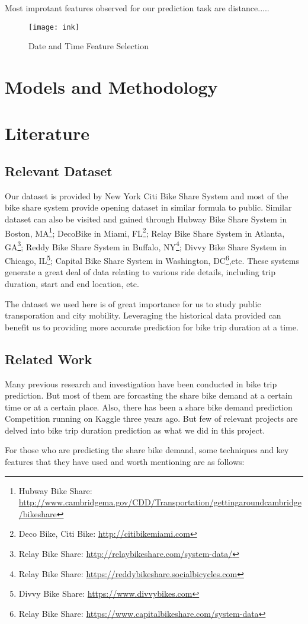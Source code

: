 Most improtant features observed for our prediction task are distance.....

  \begin{figure}[h!]
  \centering
  \texttt{[image: ink]}
  \caption{Date and Time Feature Selection}
  \label{fig_date}
  \end{figure}



\section{Models and Methodology}

\section{Literature}
\subsection{Relevant Dataset}
\par Our dataset is provided by New York Citi Bike Share System and most of the bike share system provide opening dataset in similar formula to public. Similar dataset can also be visited and gained through Hubway Bike Share System in Boston, MA\footnote{Hubway Bike Share:
\url{http://www.cambridgema.gov/CDD/Transportation/gettingaroundcambridge/bikeshare}}; DecoBike in Miami, FL\footnote{Deco Bike, Citi Bike:
\url{http://citibikemiami.com}}; Relay Bike Share System in Atlanta, GA\footnote{Relay Bike Share:
\url{http://relaybikeshare.com/system-data/}}; Reddy Bike Share System in Buffalo, NY\footnote{Relay Bike Share:
\url{https://reddybikeshare.socialbicycles.com}}; Divvy Bike Share System in Chicago, IL\footnote{Divvy Bike Share:
\url{https://www.divvybikes.com}}; Capital Bike Share System in Washington, DC\footnote{Relay Bike Share:
\url{https://www.capitalbikeshare.com/system-data}},etc. These systems generate a great deal of data relating to various ride details, including trip duration, start and end location, etc.
\par The dataset we used here is of great importance for us to study public transporation and city mobility. Leveraging the historical data provided can benefit us to providing more accurate prediction for bike trip duration at a time.
\subsection{Related Work}
\par Many previous research and investigation have been conducted in bike trip prediction. But most of them are forcasting the share bike demand at a certain time or at a certain place. Also, there has been a share bike demand prediction Competition running on Kaggle three years ago. But few of relevant projects are delved into bike trip duration prediction as what we did in this project.
\par For those who are predicting the share bike demand, some techniques and key features that they have used and worth mentioning are as follows:

